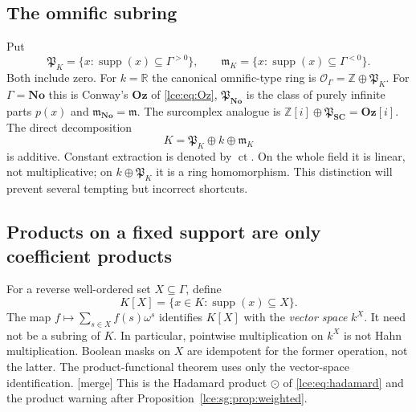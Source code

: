 \documentclass[11pt,letterpaper]{article}
\numberwithin{equation}{section}
\theoremstyle{definition}
\theoremstyle{remark}
\newcommand{\No}{\mathbf{No}}
\newcommand{\Oz}{\mathbf{Oz}}
\newcommand{\SC}{\mathbf{SC}}
\newcommand{\R}{\mathbb R}
\newcommand{\Z}{\mathbb Z}
\newcommand{\supp}{\operatorname{supp}}
\newcommand{\ct}{\operatorname{ct}}
\newcommand{\infideal}{\mathfrak m}
\newcommand{\prref}[1]{Proposition~\ref{#1}}
\newcommand{\mergetag}{\textup{\textsf{\small[merge]}}}%
\begin{document}
\subsection{The omnific subring}
Put
\[
 \mathfrak P_K=\{x:\supp(x)\subseteq\Gamma^{>0}\},\qquad
 \infideal_K=\{x:\supp(x)\subseteq\Gamma^{<0}\}.
\]
Both include zero. For $k=\R$ the canonical omnific-type ring is
$\mathcal O_\Gamma=\Z\oplus\mathfrak P_K$. For $\Gamma=\No$ this is
Conway's $\Oz$ of \eqref{lce:eq:Oz}, $\mathfrak P_{\No}$ is the class of
purely infinite parts $p(x)$ and $\infideal_{\No}=\infideal$. The surcomplex
analogue is $\Z[i]\oplus\mathfrak P_{\SC}=\Oz[i]$. The direct decomposition
\[
 K=\mathfrak P_K\oplus k\oplus\infideal_K
\]
is additive. Constant extraction is denoted by $\ct$. On the whole field it
is linear, not multiplicative; on $k\oplus\mathfrak P_K$ it is a ring
homomorphism. This distinction will prevent several tempting but incorrect
shortcuts.

\subsection{Products on a fixed support are only coefficient products}
For a reverse well-ordered set $X\subseteq\Gamma$, define
\[
 K[X]=\{x\in K:\supp(x)\subseteq X\}.
\]
The map $f\mapsto\sum_{s\in X}f(s)\omega^s$ identifies $K[X]$ with the
\emph{vector space} $k^X$. It need not be a subring of $K$. In particular,
pointwise multiplication on $k^X$ is not Hahn multiplication. Boolean masks
on $X$ are idempotent for the former operation, not the latter. The
product-functional theorem uses only the vector-space identification.
\mergetag{} This is the Hadamard product $\odot$ of \eqref{lce:eq:hadamard}
and the product warning after \prref{lce:sg:prop:weighted}.
\end{document}

